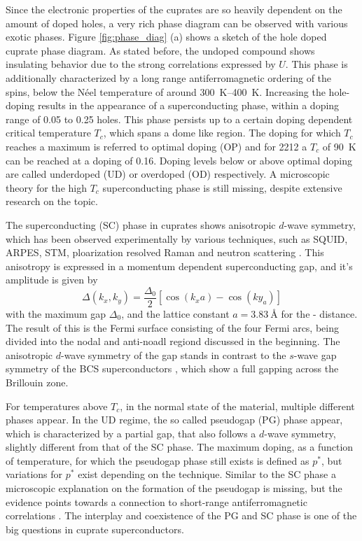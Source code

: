 Since the electronic properties of the cuprates are so heavily dependent on the amount of doped holes, a very rich phase diagram can be observed with various exotic phases.
Figure \ref{fig:phase_diag} (a) shows a sketch of the hole doped cuprate phase diagram.
As stated before, the undoped compound shows insulating behavior due to the strong correlations expressed by $U$.
This phase is additionally characterized by a long range antiferromagnetic ordering of the spins, below the Néel temperature of around \qtyrange{300}{400}{\kelvin}.
Increasing the hole-doping results in the appearance of a superconducting phase, within a doping range of 0.05 to 0.25 holes.
This phase persists up to a certain doping dependent critical temperature $T_c$, which spans a dome like region.
The doping for which $T_c$ reaches a maximum is referred to optimal doping (OP) and for 2212 a $T_c$ of \qty{90}{\kelvin} can be reached at a doping of 0.16.
Doping levels below or above optimal doping are called underdoped (UD) or overdoped (OD) respectively.
A microscopic theory for the high $T_c$ superconducting phase is still missing, despite extensive research on the topic.

The superconducting (SC) phase in cuprates shows anisotropic $d$-wave symmetry, which has been observed experimentally by various techniques, such as SQUID, ARPES, STM, ploarization resolved Raman and neutron scattering \cite{wollman_experimental_1993,tsuei_pairing_1994,tsuei_pairing_1996,shen_anomalously_1993,ding_angle-resolved_1996,chen_unconventional_2022,renner_vacuum_1995,pan_microscopic_2001,gu_directly_2019,devereaux_electronic_1994,sacuto_nodes_1997,fong_neutron_1999}.
This anisotropy is expressed in a momentum dependent superconducting gap, and it's amplitude is given by
\begin{equation}
	\Delta(k_x,k_y) = \frac{\Delta_0}{2}\left[\cos(k_xa)-\cos(ky_a)\right]
\end{equation}
with the maximum gap $\Delta_0$, and the lattice constant $a=\qty{3.83}{\angstrom}$ for the - distance.
The result of this is the Fermi surface consisting of the four Fermi arcs, being divided into the nodal and anti-noadl regiond discussed in the beginning.
The anisotropic $d$-wave symmetry of the gap stands in contrast to the $s$-wave gap symmetry of the BCS superconductors \cite{bardeen_theory_1957}, which show a full gapping across the Brillouin zone.

For temperatures above $T_c$, in the normal state of the material, multiple different phases appear.
In the UD regime, the so called pseudogap (PG) phase appear, which is characterized by a partial gap, that also follows a $d$-wave symmetry, slightly different from that of the SC phase.
The maximum doping, as a function of temperature, for which the pseudogap phase still exists is defined as $p^*$, but variations for $p^*$ exist depending on the technique.
Similar to the SC phase a microscopic explanation on the formation of the pseudogap is missing, but the evidence points towards a connection to short-range antiferromagnetic correlations \cite{zhang_effective_1988, rice_theory_1973}.
The interplay and coexistence of the PG and SC phase is one of the big questions in cuprate superconductors.

